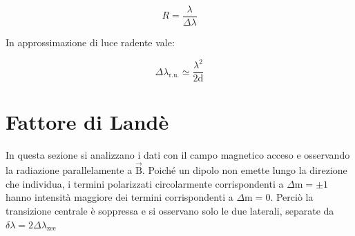\documentclass[twocolumn,10pt]{asme2ej}
\begin{document}
\begin{equation}
    R = \frac{\lambda}{\Delta \lambda}
\end{equation}

In approssimazione di luce radente vale:

\begin{equation}
    \Delta \lambda_{\text{r.u.}} \simeq \frac{\lambda^2}{2\text{d}}
    \label{e:lambdaru}
\end{equation}











\section{Fattore di Landè}


In questa sezione si analizzano i dati con il campo magnetico acceso e osservando la radiazione parallelamente a
$\vec{\text{B}}$. Poiché un dipolo non emette lungo la direzione che individua, i termini polarizzati circolarmente
corrispondenti a $\Delta \text{m} = \pm 1$ hanno intensità maggiore dei termini corrispondenti a $\Delta \text{m} = 0$.
Perciò la transizione centrale è soppressa e si osservano solo le due laterali, separate da $\delta\lambda = 2
\Delta\lambda_{\text{zee}}$
 
\end{document}
